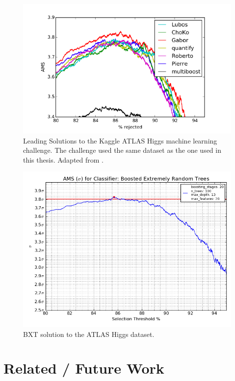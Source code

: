 \begin{figure}
\includegraphics[scale=0.6]{images/WinningAMS.png}
\caption{Leading Solutions to the Kaggle ATLAS Higgs machine learning challenge. The challenge used the same dataset as the one used in this thesis. Adapted from \cite{postRM}.}
\label{win}
\end{figure}   

\begin{figure}
\includegraphics[scale=0.6]{images/AMS_Curve_BXT_opt.png}
\caption{BXT solution to the ATLAS Higgs dataset.}
\end{figure}

\section{Related / Future Work}

